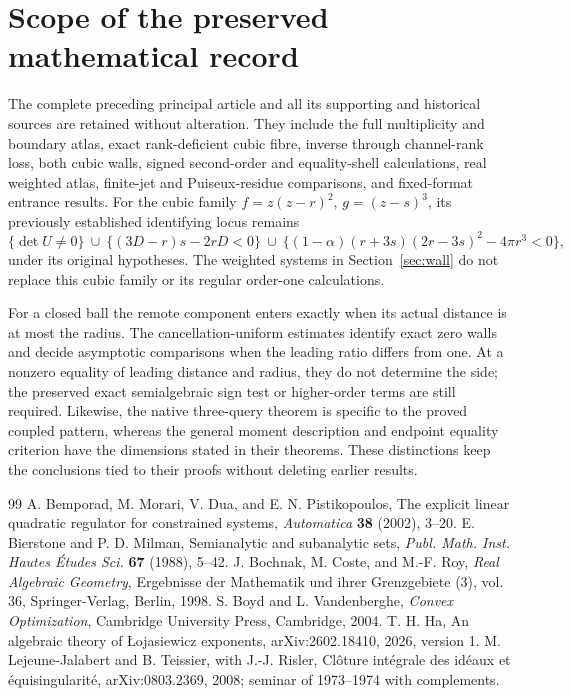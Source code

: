 \documentclass[11pt,reqno]{amsart}
\numberwithin{equation}{section}
\theoremstyle{definition}
\theoremstyle{remark}
\begin{document}
\section{Scope of the preserved mathematical record}\label{app:record}
The complete preceding principal article and all its supporting and historical sources are retained without alteration. They include the full multiplicity and boundary atlas, exact rank-deficient cubic fibre, inverse through channel-rank loss, both cubic walls, signed second-order and equality-shell calculations, real weighted atlas, finite-jet and Puiseux-residue comparisons, and fixed-format entrance results. For the cubic family $f=z(z-r)^2$, $g=(z-s)^3$, its previously established identifying locus remains
\[
 \{\det U\ne0\}\ \cup\ \{(3D-r)s-2rD<0\}\ \cup\
 \{(1-\alpha)(r+3s)(2r-3s)^2-4\pi r^3<0\},
\]
under its original hypotheses. The weighted systems in Section~\ref{sec:wall} do not replace this cubic family or its regular order-one calculations.

For a closed ball the remote component enters exactly when its actual distance is at most the radius. The cancellation-uniform estimates identify exact zero walls and decide asymptotic comparisons when the leading ratio differs from one. At a nonzero equality of leading distance and radius, they do not determine the side; the preserved exact semialgebraic sign test or higher-order terms are still required. Likewise, the native three-query theorem is specific to the proved coupled pattern, whereas the general moment description and endpoint equality criterion have the dimensions stated in their theorems. These distinctions keep the conclusions tied to their proofs without deleting earlier results.

\begin{thebibliography}{99}
 A. Bemporad, M. Morari, V. Dua, and E. N. Pistikopoulos,
The explicit linear quadratic regulator for constrained systems,
\emph{Automatica} \textbf{38} (2002), 3--20.
 E. Bierstone and P. D. Milman,
Semianalytic and subanalytic sets,
\emph{Publ. Math. Inst. Hautes \'Etudes Sci.} \textbf{67} (1988), 5--42.
\bibitem{BCR} J. Bochnak, M. Coste, and M.-F. Roy,
\emph{Real Algebraic Geometry}, Ergebnisse der Mathematik und ihrer Grenzgebiete (3), vol. 36, Springer-Verlag, Berlin, 1998.
\bibitem{BV} S. Boyd and L. Vandenberghe,
\emph{Convex Optimization}, Cambridge University Press, Cambridge, 2004.
\bibitem{Ha} T. H. Ha,
An algebraic theory of \L{}ojasiewicz exponents,
arXiv:2602.18410, 2026, version 1.
 M. Lejeune-Jalabert and B. Teissier, with J.-J. Risler,
Cl\^oture int\'egrale des id\'eaux et \'equisingularit\'e,
arXiv:0803.2369, 2008; seminar of 1973--1974 with complements.
\end{thebibliography}
\end{document}
